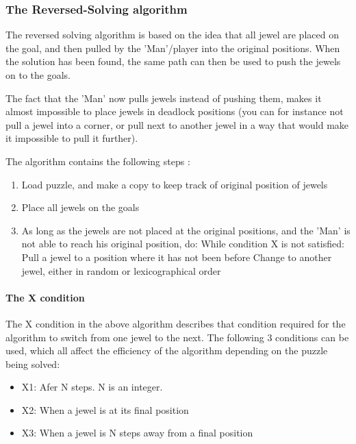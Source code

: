\subsubsection{The Reversed-Solving algorithm}
The reversed solving algorithm is based on the idea that all jewel are placed on the goal, and then pulled by the 'Man'/player into the original positions. When the solution has been found, the same path can then be used to push the jewels on to the goals.

The fact that the 'Man' now pulls jewels instead of pushing them, makes it almost impossible to place jewels in deadlock positions (you can for instance not pull a jewel into a corner, or pull next to another jewel in a way that would make it impossible to pull it further).

The algorithm contains the following steps \cite{franktakes}:

\begin{enumerate}
\item Load puzzle, and make a copy to keep track of original position of jewels
\item Place all jewels on the goals
\item As long as the jewels are not placed at the original positions, and the 'Man' is not able to reach his original position, do:
\subitem While condition X is not satisfied:
\subsubitem Pull a jewel to a position where it has not been before
\subitem Change to another jewel, either in random or lexicographical order
\end{enumerate}

\paragraph{The X condition}
The X condition in the above algorithm describes that condition required for the algorithm to switch from one jewel to the next. The following 3 conditions can be used, which all affect the efficiency of the algorithm depending on the puzzle being solved:

\begin{itemize}
\item X1: Afer N steps. N is an integer.
\item X2: When a jewel is at its final position
\item X3: When a jewel is N steps away from a final position
\end{itemize}

